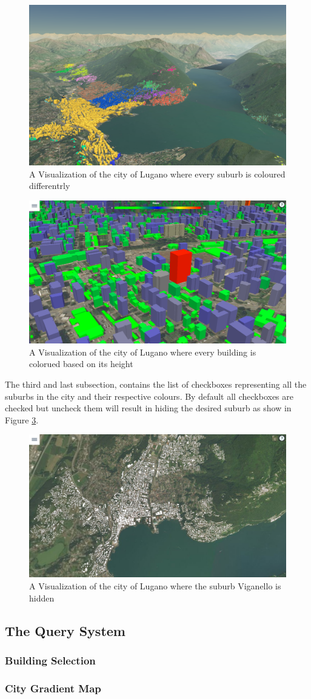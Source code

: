 \begin{figure} [H]
\centering
\includegraphics[width=.8\textwidth]{chapter4/images/application_bySuburb}
\caption{A Visualization of the city of Lugano where every suburb is coloured differentrly}
\label{fig:application_bySuburb}
\end{figure}
\begin{figure} [H]
\centering
\includegraphics[width=.8\textwidth]{chapter4/images/application_byHeight}
\caption{A Visualization of the city of Lugano where every building is colorued based on its height}
\label{fig:application_byHeight}
\end{figure}
The third and last subsection, contains the list of checkboxes representing all the suburbs in the city and their respective colours. By default all checkboxes are checked but uncheck them will result in hiding the desired suburb as show in Figure \ref{fig:application_showSuburb}.
\begin{figure} [H]
\centering
\includegraphics[width=.8\textwidth]{chapter4/images/application_showSuburb}
\caption{A Visualization of the city of Lugano where the suburb Viganello is hidden}
\label{fig:application_showSuburb}
\end{figure}

\subsection{The Query System}
\subsubsection{Building Selection}
\subsubsection{City Gradient Map}